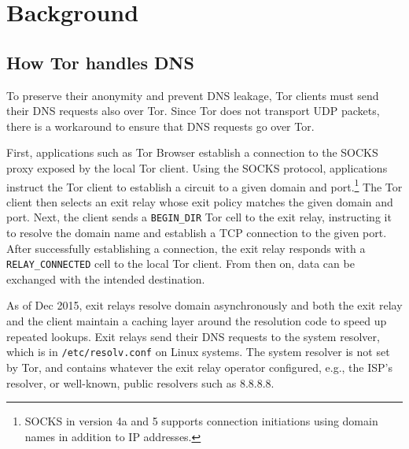 \section{Background}
\label{sec:background}

\subsection{How Tor handles DNS}
To preserve their anonymity and prevent DNS leakage, Tor clients must send their
DNS requests also over Tor.  Since Tor does not transport UDP packets, there is
a workaround to ensure that DNS requests go over Tor.

First, applications such as Tor Browser establish a connection to the SOCKS
proxy exposed by the local Tor client.  Using the SOCKS protocol, applications
instruct the Tor client to establish a circuit to a given domain and
port.\footnote{SOCKS in version 4a and 5 supports connection initiations using
domain names in addition to IP addresses.} The Tor client then selects an exit
relay whose exit policy matches the given domain and port.  Next, the client
sends a \texttt{BEGIN\_DIR} Tor cell to the exit relay, instructing it to
resolve the domain name and establish a TCP connection to the given port.  After
successfully establishing a connection, the exit relay responds with a
\texttt{RELAY\_CONNECTED} cell to the local Tor client.  From then on, data can
be exchanged with the intended destination.

As of Dec 2015, exit relays resolve domain asynchronously and both the exit
relay and the client maintain a caching layer around the resolution code to
speed up repeated lookups.  Exit relays send their DNS requests to the system
resolver, which is in \texttt{/etc/resolv.conf} on Linux systems.  The system
resolver is not set by Tor, and contains whatever the exit relay operator
configured, e.g., the ISP's resolver, or well-known, public resolvers such as
8.8.8.8.
